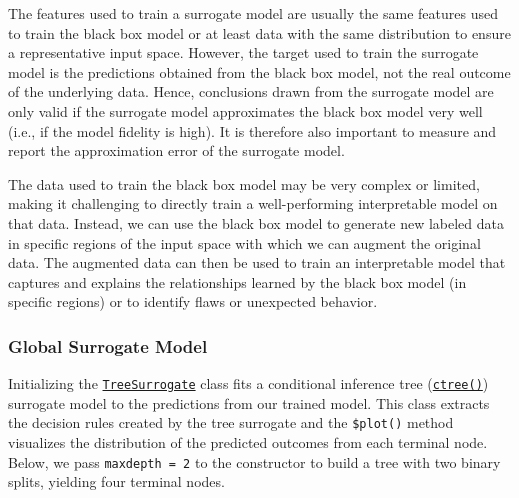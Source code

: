 The features used to train a surrogate model are usually the same
features used to train the black box model or at least data with the
same distribution to ensure a representative input space. However, the
target used to train the surrogate model is the predictions obtained
from the black box model, not the real outcome of the underlying data.
Hence, conclusions drawn from the surrogate model are only valid if the
surrogate model approximates the black box model very well (i.e., if the
model fidelity is high). It is therefore also important to measure and
report the approximation error of the surrogate model.

The data used to train the black box model may be very complex or
limited, making it challenging to directly train a well-performing
interpretable model on that data. Instead, we can use the black box
model to generate new labeled data in specific regions of the input
space with which we can augment the original data. The augmented data
can then be used to train an interpretable model that captures and
explains the relationships learned by the black box model (in specific
regions) or to identify flaws or unexpected behavior.

\hypertarget{global-surrogate-model}{%
\subsubsection{Global Surrogate Model}\label{global-surrogate-model}}

Initializing the
\href{https://www.rdocumentation.org/packages/iml/topics/TreeSurrogate}{\texttt{TreeSurrogate}}
class fits a conditional inference tree
(\href{https://www.rdocumentation.org/packages/partykit/topics/ctree}{\texttt{ctree()}})
surrogate model to the predictions from our trained model. This class
extracts the decision rules created by the tree surrogate and the
\texttt{\$plot()} method visualizes the distribution of the predicted
outcomes from each terminal node. Below, we pass \texttt{maxdepth\ =\ 2}
to the constructor to build a tree with two binary splits, yielding four
terminal nodes.

\begin{Shaded}
\begin{Highlighting}[]
\OtherTok{=}\SpecialCharTok{$}
\end{Highlighting}
\end{Shaded}

